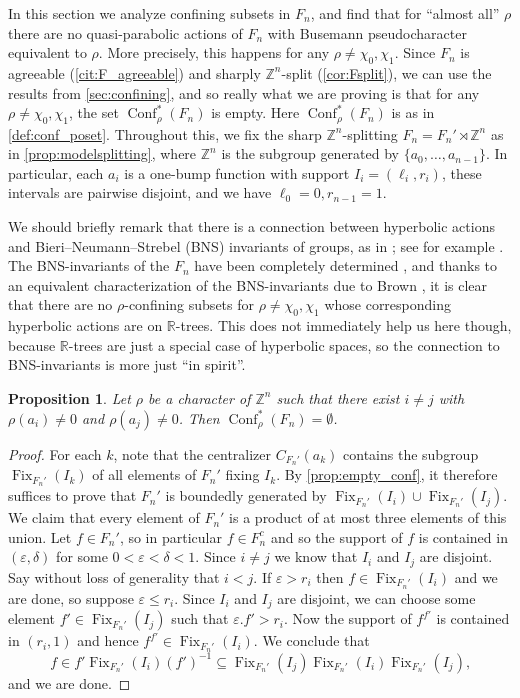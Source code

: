 \documentclass[reqno,12pt]{amsart}\setcounter{tocdepth}{1}
\newtheorem{proposition}[theorem]{Proposition}
\theoremstyle{definition}
\newcommand{\Z}{\mathbb{Z}}
\newcommand{\R}{\mathbb{R}}
\DeclareMathOperator{\Fix}{Fix}
\DeclareMathOperator{\Conf}{Conf}
\numberwithin{equation}{section}
\begin{document}
In this section we analyze confining subsets in $F_n$, and find that for ``almost all'' $\rho$ there are no quasi-parabolic actions of $F_n$ with Busemann pseudocharacter equivalent to $\rho$. More precisely, this happens for any $\rho\ne \chi_0,\chi_1$. Since $F_n$ is agreeable (\cref{cit:F_agreeable}) and sharply $\Z^n$-split (\cref{cor:Fsplit}), we can use the results from \cref{sec:confining}, and so really what we are proving is that for any $\rho\ne \chi_0,\chi_1$, the set $\Conf^\ast_\rho(F_n)$ is empty. Here $\Conf^\ast_\rho(F_n)$ is as in \cref{def:conf_poset}. Throughout this, we fix the sharp $\Z^n$-splitting $F_n = F_n' \rtimes \mathbb{Z}^n$ as in \cref{prop:modelsplitting}, where $\Z^n$ is the subgroup generated by $\{a_0,\dots,a_{n-1}\}$. In particular, each $a_i$ is a one-bump function with support $I_i = (\ell_i, r_i)$, these intervals are pairwise disjoint, and we have $\ell_0 = 0, r_{n-1} = 1$.

We should briefly remark that there is a connection between hyperbolic actions and Bieri--Neumann--Strebel (BNS) invariants of groups, as in \cite{bieri87}; see for example \cite[Subsection~4.3]{confining}. The BNS-invariants of the $F_n$ have been completely determined \cite[Theorem~8.1]{bieri87}, and thanks to an equivalent characterization of the BNS-invariants due to Brown \cite[Corollary~7.4]{brown87trees}, it is clear that there are no $\rho$-confining subsets for $\rho \neq \chi_0, \chi_1$ whose corresponding hyperbolic actions are on $\R$-trees. This does not immediately help us here though, because $\R$-trees are just a special case of hyperbolic spaces, so the connection to BNS-invariants is more just ``in spirit''.

\begin{proposition}\label{prop:usually_empty_conf}
Let $\rho$ be a character of $\Z^n$ such that there exist $i\ne j$ with $\rho(a_i)\ne 0$ and $\rho(a_j)\ne 0$. Then $\Conf^\ast_\rho(F_n)=\emptyset$.
\end{proposition}

\begin{proof}
For each $k$, note that the centralizer $C_{F_n'}(a_k)$ contains the subgroup $\Fix_{F_n'}(I_k)$ of all elements of $F_n'$ fixing $I_k$. By \cref{prop:empty_conf}, it therefore suffices to prove that $F_n'$ is boundedly generated by $\Fix_{F_n'}(I_i)\cup \Fix_{F_n'}(I_j)$. We claim that every element of $F_n'$ is a product of at most three elements of this union.
Let $f\in F_n'$, so in particular $f \in F_n^c$ and so the support of $f$ is contained in $(\varepsilon,\delta)$ for some $0<\varepsilon<\delta<1$. Since $i\ne j$ we know that $I_i$ and $I_j$ are disjoint. Say without loss of generality that $i<j$. If $\varepsilon>r_i$ then $f\in \Fix_{F_n'}(I_i)$ and we are done, so suppose $\varepsilon\le r_i$. Since $I_i$ and $I_j$ are disjoint, we can choose some element $f'\in \Fix_{F_n'}(I_j)$ such that $\varepsilon.f'>r_i$. Now the support of $f^{f'}$ is contained in $(r_i,1)$ and hence $f^{f'}\in\Fix_{F_n'}(I_i)$. We conclude that
\[
f\in f'\Fix_{F_n'}(I_i)(f')^{-1} \subseteq \Fix_{F_n'}(I_j)\Fix_{F_n'}(I_i)\Fix_{F_n'}(I_j)\text{,}
\] and we are done.
\end{proof}
\end{document}
